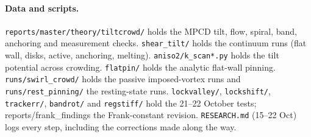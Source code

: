 \documentclass[11pt,a4paper]{article}
\begin{document}
\paragraph{Data and scripts.} \texttt{reports/master/theory/tiltcrowd/} holds the MPCD tilt, flow, spiral, band, anchoring and measurement checks. \texttt{shear\_tilt/} holds the continuum runs (flat wall, disks, active, anchoring, melting). \texttt{aniso2/k\_scan*.py} holds the tilt potential across crowding. \texttt{flatpin/} holds the analytic flat-wall pinning. \texttt{runs/swirl\_crowd/} holds the passive imposed-vortex runs and \texttt{runs/rest\_pinning/} the resting-state runs. \texttt{lockvalley/}, \texttt{lockshift/}, \texttt{trackerr/}, \texttt{bandrot/} and \texttt{regstiff/} hold the 21--22 October tests; reports/frank\_findings the Frank-constant revision. \texttt{RESEARCH.md} (15--22 Oct) logs every step, including the corrections made along the way.
\end{document}
